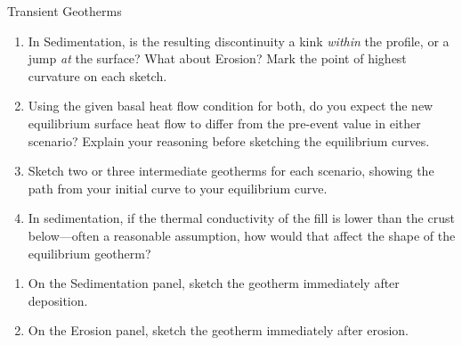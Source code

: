 \begin{activity}{Transient Geotherms}
\begin{questions}
\begin{enumerate}[label=(\alph*)]
    \item In Sedimentation, is the resulting discontinuity a kink \emph{within} the profile, or a jump \emph{at} the surface? What about Erosion? Mark the point of highest curvature on each sketch.
    \answerbox[2.5cm]

    \item Using the given basal heat flow condition for both, do you expect the new equilibrium surface heat flow to differ from the pre-event value in either scenario? Explain your reasoning before sketching the equilibrium curves.
    \answerbox[2.5cm]

    \item Sketch two or three intermediate geotherms for each scenario, showing the path from your initial curve to your equilibrium curve.
    \answerbox[2cm]

    \item In sedimentation, if the thermal conductivity of the fill is lower than the crust below---often a reasonable assumption, how would that affect the shape of the equilibrium geotherm?
    \answerbox[2cm]
 \end{enumerate}
\end{questions}

\begin{minipage}{0.48\textwidth}
\end{minipage}
\hfill
\begin{minipage}{0.48\textwidth}
\end{minipage}

\begin{questions}[resume]
  \begin{enumerate}[label=(\alph*)]
    \item On the Sedimentation panel, sketch the geotherm immediately after deposition.
    \answerbox[1.5cm]

    \item On the Erosion panel, sketch the geotherm immediately after erosion.
    \answerbox[1.5cm]


\end{enumerate}
\end{questions}
\end{activity}
